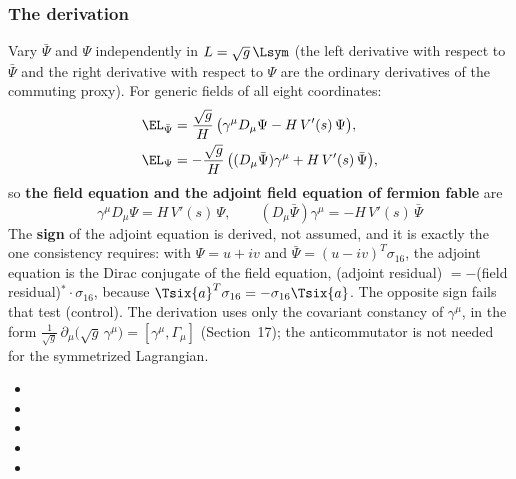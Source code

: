 \subsubsection{The derivation}
\label{sec:3.4.1}

Vary $\bar\Psi$ and $\Psi$ independently in $L=\sqrt g\,\Lsym$ (the left derivative with respect to
$\bar\Psi$ and the right derivative with respect to $\Psi$ are the ordinary derivatives of the
commuting proxy). For generic fields of all eight coordinates:
\begin{align*}
  \EL_{\bar\Psi} &= \frac{\sqrt g}{H}\,\bigl(\gamma^\mu D_\mu\Psi-H\,V'(s)\,\Psi\bigr),\\
  \EL_{\Psi} &= -\frac{\sqrt g}{H}\,\bigl((D_\mu\bar\Psi)\gamma^\mu+H\,V'(s)\,\bar\Psi\bigr),
\end{align*}
so \textbf{the field equation and the adjoint field equation of fermion fable} are
\[
  \boxed{\;\gamma^\mu D_\mu\Psi=H\,V'(s)\,\Psi,\qquad (D_\mu\bar\Psi)\gamma^\mu=-H\,V'(s)\,\bar\Psi\;}
\]
The \textbf{sign} of the adjoint equation is derived, not assumed, and it is exactly the one
consistency requires: with $\Psi=u+iv$ and $\bar\Psi=(u-iv)^{T}\sigma_{16}$, the adjoint equation is
the Dirac conjugate of the field equation, (adjoint residual) $=-$(field residual)${}^{*}\cdot\sigma_{16}$,
because $\Tsix{a}^{T}\sigma_{16}=-\sigma_{16}\Tsix{a}$. The opposite sign fails that test (control).
The derivation uses only the covariant constancy of $\gamma^\mu$, in the form
$\frac{1}{\sqrt g}\,\partial_\mu\bigl(\sqrt g\,\gamma^\mu\bigr)=[\gamma^\mu,\Gamma_\mu]$ (Section~17);
the anticommutator is not needed for the symmetrized Lagrangian. 
\begin{itemize}
  \item {}
  \item {}
  \item {}
  \item {}
  \item {}
\end{itemize}

